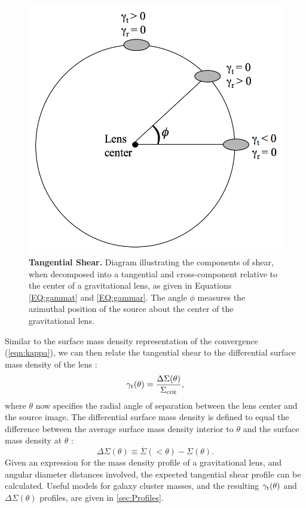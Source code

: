 \begin{figure}
\begin{center}
\includegraphics[scale=0.4]{plots_intro/TangentialShear.png}
\caption[Tangential Shear]{{\bf Tangential Shear.} Diagram illustrating the components of shear, when decomposed into a tangential and cross-component relative to the center of a gravitational lens, as given in Equations \ref{EQ:gammat} and \ref{EQ:gammar}. The angle $\phi$ measures the azimuthal position of the source about the center of the gravitational lens.}
\label{plot:shearcomponents}
\end{center}
\end{figure}

Similar to the surface mass density representation of the convergence (\autoref{eqn:kappa}), we can then relate the tangential shear to the differential surface mass density of the lens \citep{KS93,Kaiser94,Fahlman94}:
\begin{equation}
\gamma_{\rm t}(\theta) = \frac{\Delta\Sigma(\theta)}{\Sigma_{\rm crit}},
\end{equation}
where $\theta$ now specifies the radial angle of separation between the lens center and the source image. The differential surface mass density is defined to equal the difference between the average surface mass density interior to $\theta$ and the surface mass density at $\theta$ \citep{Wright00}: 
\begin{equation}
\label{eqn:deltasigma}
\Delta\Sigma(\theta) \equiv \overline{\Sigma}(< \theta) - \Sigma(\theta).
\end{equation}
Given an expression for the mass density profile of a gravitational lens, and angular diameter distances involved, the expected tangential shear profile can be calculated. Useful models for galaxy cluster masses, and the resulting $\gamma_{\rm t}(\theta)$ and $\Delta\Sigma(\theta)$ profiles, are given in \autoref{sec:Profiles}.

